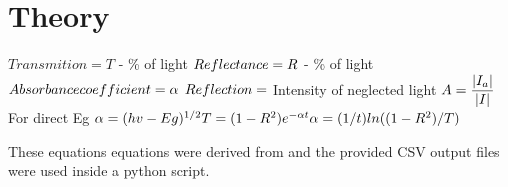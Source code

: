 \documentclass[10pt,a4paper]{article}
\begin{document}
\section*{Theory}
\begin{indentPar}{1cm}
\begin{indentPar}{1cm}
$Transmition = T$ - \% of light 
$\\Reflectance = R$ - \% of light
$ \\Absorbance coefficient = \alpha \\ $
$\\Reflection =$ Intensity of neglected light
$\\A= \dfrac{|I_a|}{|I|}$
 For direct Eg $\alpha =(hv-Eg)^{1/2}\\T = (1-R^2)e^{-\alpha t}\\ \alpha = (1/t)ln((1-R^2)/T)$
\\
\end{indentPar}

These equations equations were derived from and the provided CSV output files were used inside a python script.
\end{indentPar}
\end{document}
